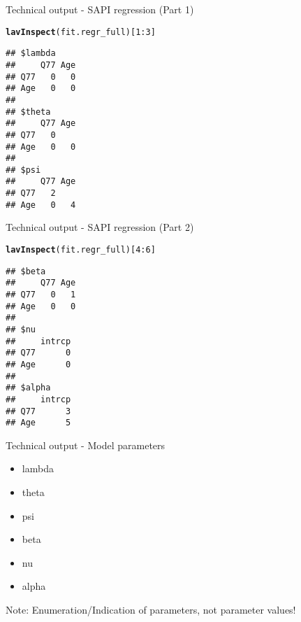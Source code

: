 \documentclass[10pt]{beamer}\usepackage[]{graphicx}\usepackage[]{xcolor}
\makeatletter
\newcommand{\hlnum}[1]{\textcolor[rgb]{0.686,0.059,0.569}{#1}}%
\newcommand{\hlopt}[1]{\textcolor[rgb]{0,0,0}{#1}}%
\newcommand{\hlstd}[1]{\textcolor[rgb]{0.345,0.345,0.345}{#1}}%
\newcommand{\hlkwd}[1]{\textcolor[rgb]{0.737,0.353,0.396}{\textbf{#1}}}%
\newenvironment{kframe}{%
 \def\at@end@of@kframe{}%
 \ifinner\ifhmode%
  \def\at@end@of@kframe{\end{minipage}}%
  \begin{minipage}{\columnwidth}%
 \fi\fi%
 \def\FrameCommand##1{\hskip\@totalleftmargin \hskip-\fboxsep
 \colorbox{shadecolor}{##1}\hskip-\fboxsep
     \hskip-\linewidth \hskip-\@totalleftmargin \hskip\columnwidth}%
 \MakeFramed {\advance\hsize-\width
   \@totalleftmargin\z@ \linewidth\hsize
   \@setminipage}}%
 {\par\unskip\endMakeFramed%
 \at@end@of@kframe}
\newenvironment{knitrout}{}{} %
\makeatother
\begin{document}
\begin{frame}[fragile]{Technical output - SAPI regression (Part 1)}
\begin{knitrout}
\color{fgcolor}\begin{kframe}
\begin{alltt}
\hlkwd{lavInspect}\hlstd{(fit.regr_full)[}\hlnum{1}\hlopt{:}\hlnum{3}\hlstd{]}
\end{alltt}
\begin{verbatim}
## $lambda
##     Q77 Age
## Q77   0   0
## Age   0   0
## 
## $theta
##     Q77 Age
## Q77   0    
## Age   0   0
## 
## $psi
##     Q77 Age
## Q77   2    
## Age   0   4
\end{verbatim}
\end{kframe}
\end{knitrout}
\end{frame}
%
\begin{frame}[fragile]{Technical output - SAPI regression (Part 2)}
\begin{knitrout}
\color{fgcolor}\begin{kframe}
\begin{alltt}
\hlkwd{lavInspect}\hlstd{(fit.regr_full)[}\hlnum{4}\hlopt{:}\hlnum{6}\hlstd{]}
\end{alltt}
\begin{verbatim}
## $beta
##     Q77 Age
## Q77   0   1
## Age   0   0
## 
## $nu
##     intrcp
## Q77      0
## Age      0
## 
## $alpha
##     intrcp
## Q77      3
## Age      5
\end{verbatim}
\end{kframe}
\end{knitrout}
\end{frame}
%
\begin{frame}[fragile]{Technical output - Model parameters}

\begin{itemize}
\item lambda
\item theta
\item psi
\item beta
\item nu
\item alpha
\end{itemize}

\vspace{5mm}

Note: Enumeration/Indication of parameters, not parameter values!

\end{frame}
%
\end{document}
